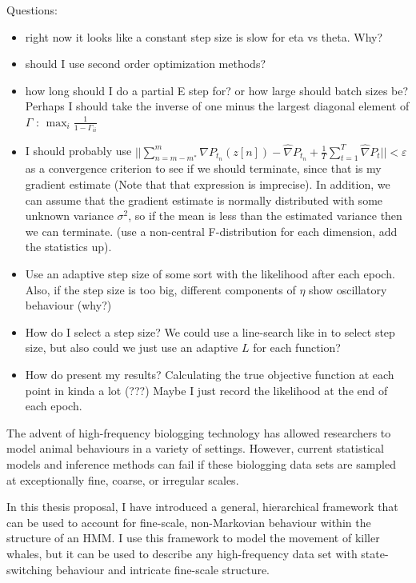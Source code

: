 \iffalse

Questions:

\begin{itemize}
    \item right now it looks like a constant step size is slow for eta vs theta. Why?
    \item should I use second order optimization methods?
    \item how long should I do a partial E step for? or how large should batch sizes be? Perhaps I should take the inverse of one minus the largest diagonal element of $\Gamma$ : $\max_i \frac{1}{1-\Gamma_{ii}}$
    \item I should probably use $||\sum_{n=m-m^*}^{m} \nabla P_{t_n}(z[n]) - \widehat \nabla P_{t_n} + \frac{1}{T} \sum_{t=1}^T \widehat \nabla P_t|| < \varepsilon$ as a convergence criterion to see if we should terminate, since that is my gradient estimate (Note that that expression is imprecise). In addition, we can assume that the gradient estimate is normally distributed with some unknown variance $\sigma^2$, so if the mean is less than the estimated variance then we can terminate. (use a non-central F-distribution for each dimension, add the statistics up).
    \item Use an adaptive step size of some sort with the likelihood after each epoch. Also, if the step size is too big, different components of $\eta$ show oscillatory behaviour (why?)
    \item How do I select a step size? We could use a line-search like in \citep{Schmidt:2017} to select step size, but also could we just use an adaptive $L$ for each function?  
    \item How do present my results? Calculating the true objective function at each point in kinda a lot (???) Maybe I just record the likelihood at the end of each epoch.
\end{itemize}

The advent of high-frequency biologging technology has allowed researchers to model animal behaviours in a variety of settings. However, current statistical models and inference methods can fail if these biologging data sets are sampled at exceptionally fine, coarse, or irregular scales.

In this thesis proposal, I have introduced a general, hierarchical framework that can be used to account for fine-scale, non-Markovian behaviour within the structure of an HMM. I use this framework to model the movement of killer whales, but it can be used to describe any high-frequency data set with state-switching behaviour and intricate fine-scale structure. 

